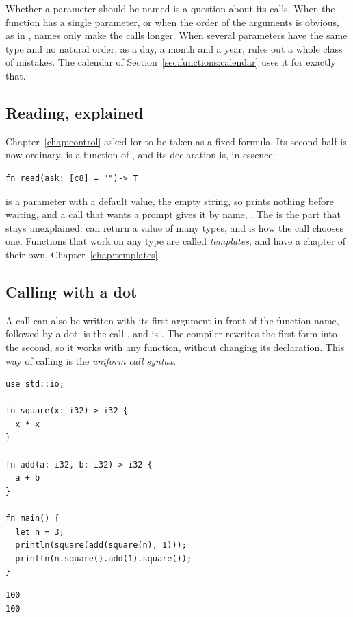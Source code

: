 Whether a parameter should be named is a question about its calls. When the
function has a single parameter, or when the order of the arguments is obvious,
as in , names only make the calls longer. When
several parameters have the same type and no natural order, as a day, a month
and a year,  rules out a whole class of mistakes. The calendar of
Section~\ref{sec:functions:calendar} uses it for exactly that.

\subsection{Reading, explained}
\label{sec:functions:read}

Chapter~\ref{chap:control} asked for  to
be taken as a fixed formula. Its second half is now ordinary.  is a
function of , and its declaration is, in essence:

\begin{lstlisting}[style=coloredverbatim]
fn read(ask: [c8] = "")-> T
\end{lstlisting}

 is a parameter with a default value, the empty string, so
 prints nothing before waiting, and a call that wants a prompt
gives it by name, . The  is the part that
stays unexplained:  can return a value of many types, and
 is how the call chooses one. Functions that work on any type are
called \textit{templates}, and have a chapter of their own,
Chapter~\ref{chap:templates}.

\subsection{Calling with a dot}
\label{sec:functions:ucs}

A call can also be written with its first argument in front of the function
name, followed by a dot:  is the call , and
 is . The compiler rewrites the first form into
the second, so it works with any function, without changing its declaration.
This way of calling is the \textit{uniform call syntax}.

\begin{lstlisting}[style=coloredverbatim, caption=Calls written with a dot, label=lst:functions:ucs]
use std::io;

fn square(x: i32)-> i32 {
  x * x
}

fn add(a: i32, b: i32)-> i32 {
  a + b
}

fn main() {
  let n = 3;
  println(square(add(square(n), 1)));
  println(n.square().add(1).square());
}
\end{lstlisting}
\vspace{-10pt}%
\begin{lstlisting}[style=bashVerb]
100
100
\end{lstlisting}

